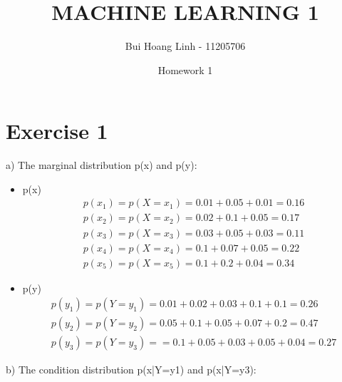 \documentclass{article}
\title{MACHINE LEARNING 1}
\author{Bui Hoang Linh - 11205706}
\date{Homework 1}
\begin{document}
\maketitle

\section {Exercise 1}
a)
The marginal distribution p(x) and p(y):
\begin{itemize}
    \item p(x)
    \begin{align}
        p(x_1) = p(X=x_1) = 0.01 + 0.05 + 0.01 = 0.16\\
        p(x_2) = p(X=x_2) = 0.02 + 0.1 + 0.05 = 0.17\\
        p(x_3) = p(X=x_3) = 0.03 + 0.05 + 0.03 = 0.11\\
        p(x_4) = p(X=x_4) = 0.1 + 0.07 + 0.05 = 0.22\\
        p(x_5) = p(X=x_5) = 0.1 + 0.2 + 0.04 = 0.34
    \end{align}
    \item p(y)
    \begin{align}
        p(y_1) = p(Y=y_1) = 0.01 + 0.02 + 0.03 + 0.1 + 0.1 = 0.26\\
        p(y_2) = p(Y=y_2) = 0.05 + 0.1 + 0.05 + 0.07 + 0.2 = 0.47\\
        p(y_3) = p(Y=y_3) = = 0.1 + 0.05 + 0.03 + 0.05 + 0.04 = 0.27
    \end{align}
       
\end{itemize}
b)
The condition distribution p(x|Y=y1) and p(x|Y=y3):
\end{document}
